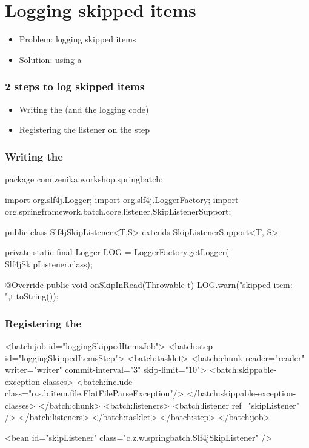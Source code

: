 \section{Logging skipped items}

\begin{frame}
 \begin{itemize}
  \item Problem: logging skipped items
  \item Solution: using a 
 \end{itemize}
\end{frame}

\begin{frame}
 \frametitle{2 steps to log skipped items}
 \begin{itemize}
  \item Writing the  (and the logging code)
  \item Registering the listener on the step  
 \end{itemize}
\end{frame}


\begin{frame}[fragile]
 \frametitle{Writing the }
 \begin{javacode}
package com.zenika.workshop.springbatch;

import org.slf4j.Logger;
import org.slf4j.LoggerFactory;
import org.springframework.batch.core.listener.SkipListenerSupport;

public class Slf4jSkipListener<T,S> extends SkipListenerSupport<T, S> {

  private static final Logger LOG = LoggerFactory.getLogger(
      Slf4jSkipListener.class);

  @Override
  public void onSkipInRead(Throwable t) {
    LOG.warn("skipped item: {}",t.toString());
  }

}  
 \end{javacode}

\end{frame}


\begin{frame}[fragile]
\frametitle{Registering the }
\begin{xmlcode}
<batch:job id="loggingSkippedItemsJob">
  <batch:step id="loggingSkippedItemsStep">
    <batch:tasklet>
      <batch:chunk reader="reader" writer="writer" commit-interval="3"
                   skip-limit="10">
        <batch:skippable-exception-classes>
          <batch:include
           class="o.s.b.item.file.FlatFileParseException"/>
        </batch:skippable-exception-classes>
      </batch:chunk>
      <batch:listeners>
        <batch:listener ref="skipListener" />
      </batch:listeners>
    </batch:tasklet>
  </batch:step>
</batch:job>

<bean id="skipListener" class="c.z.w.springbatch.Slf4jSkipListener" />
\end{xmlcode}
\end{frame}


